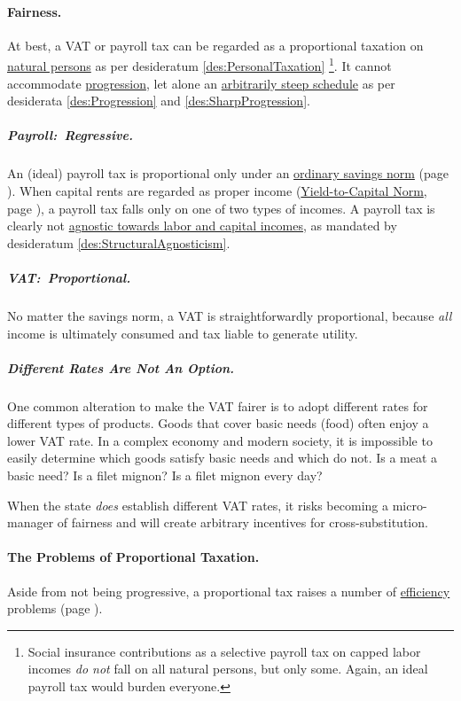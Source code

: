 \paragraph{Fairness.} At best, a VAT or payroll tax can be regarded as a proportional taxation on \hyperref[des:PersonalTaxation]{natural persons} as per desideratum \ref{des:PersonalTaxation}
\footnote{
	Social insurance contributions as a selective payroll tax on capped labor incomes \emph{do not} fall on all natural persons, but only some.
	Again, an ideal payroll tax would burden everyone.
}.
It cannot accommodate \hyperref[des:Progression]{progression}, let alone an \hyperref[des:SharpProgression]{arbitrarily steep schedule} as per  desiderata \ref{des:Progression} and \ref{des:SharpProgression}.

\subparagraph{Payroll:~Regressive.} An (ideal) payroll tax is proportional only under an \hyperref[sec:OSN]{ordinary savings norm} (page \pageref{sec:OSN}).
When capital rents are regarded as proper income (\hyperref[sec:Y2C]{Yield-to-Capital Norm}, page \pageref{sec:Y2C}), a payroll tax falls only on one of two types of incomes.
A payroll tax is clearly not \hyperref[des:StructuralAgnosticism]{agnostic towards labor and capital incomes}, as mandated by desideratum \ref{des:StructuralAgnosticism}.

\subparagraph{VAT:~Proportional.} No matter the savings norm, a VAT is straightforwardly proportional, because \emph{all} income is ultimately consumed and tax liable to generate utility.

\subparagraph{Different Rates Are Not An Option.} One common alteration to make the VAT fairer is to adopt different rates for different types of products.
Goods that cover basic needs (food) often enjoy a lower VAT rate.
In a complex economy and modern society, it is impossible to easily determine which goods satisfy basic needs and which do not.
Is a meat a basic need?
Is a filet mignon?
Is a filet mignon every day?

When the state \emph{does} establish different VAT rates, it risks becoming a micro-manager of fairness and will create arbitrary incentives for cross-substitution.

\paragraph{The Problems of Proportional Taxation.} Aside from not being progressive, a proportional tax raises a number of \hyperref[sec:Efficiency]{efficiency} problems (page \pageref{sec:Efficiency}).

